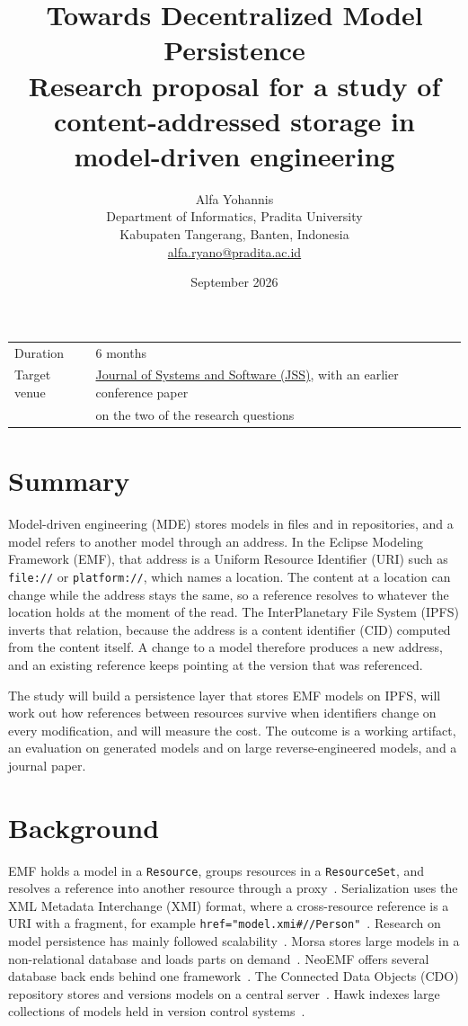 \documentclass[11pt,a4paper]{article}
\title{\vspace{-12mm}\textbf{Towards Decentralized Model Persistence}\\[2mm]
\large Research proposal for a study of content-addressed storage in model-driven engineering}
\author{Alfa Yohannis\\
\small Department of Informatics, Pradita University\\
\small Kabupaten Tangerang, Banten, Indonesia\\
\small \href{mailto:alfa.ryano@pradita.ac.id}{alfa.ryano@pradita.ac.id}}
\date{September 2026}
\begin{document}
\maketitle

\begin{center}
\begin{tabular}{@{}ll@{}}
\toprule
Duration & 6 months \\
Target venue & \href{https://www.sciencedirect.com/journal/journal-of-systems-and-software}{Journal of Systems and Software (JSS)}, with an earlier conference paper \\
 & on the two of the research questions \\
\bottomrule
\end{tabular}
\end{center}

\section{Summary}

Model-driven engineering (MDE) stores models in files and in repositories, and a model refers to another model through an address. In the Eclipse Modeling Framework (EMF), that address is a Uniform Resource Identifier (URI) such as \texttt{file://} or \texttt{platform://}, which names a location. The content at a location can change while the address stays the same, so a reference resolves to whatever the location holds at the moment of the read. The InterPlanetary File System (IPFS) inverts that relation, because the address is a content identifier (CID) computed from the content itself. A change to a model therefore produces a new address, and an existing reference keeps pointing at the version that was referenced.

The study will build a persistence layer that stores EMF models on IPFS, will work out how references between resources survive when identifiers change on every modification, and will measure the cost. The outcome is a working artifact, an evaluation on generated models and on large reverse-engineered models, and a journal paper.

\section{Background}

EMF holds a model in a \texttt{Resource}, groups resources in a \texttt{ResourceSet}, and resolves a reference into another resource through a proxy~\cite{steinberg2008emf}. Serialization uses the XML Metadata Interchange (XMI) format, where a cross-resource reference is a URI with a fragment, for example \texttt{href="model.xmi\#//Person"}~\cite{omg2015xmi}. Research on model persistence has mainly followed scalability~\cite{kolovos2013roadmap}. Morsa stores large models in a non-relational database and loads parts on demand~\cite{pagan2015repository}. NeoEMF offers several database back ends behind one framework~\cite{daniel2017neoemf}. The Connected Data Objects (CDO) repository stores and versions models on a central server~\cite{cdo}. Hawk indexes large collections of models held in version control systems~\cite{barmpis2013hawk}.
\end{document}
